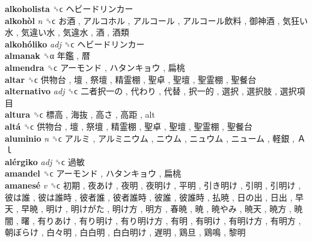 \textbf{alkoholista} ␝ϲ   ヘビードリンカー   \\
\textbf{alkohòl} \emph{n}  ␝ϲ   お酒 ,  アルコホル ,  アルコール ,  アルコール飲料 ,  御神酒 ,  気狂い水 ,  気違い水 ,  気違水 ,  酒 ,  酒類   \\
\textbf{alkohóliko} \emph{adj}  ␝ϲ   ヘビードリンカー   \\
\textbf{almanak} ␝α   年鑑 ,  暦   \\
\textbf{almendra} ␝ϲ   アーモンド ,  ハタンキョウ ,  扁桃   \\
\textbf{altar} ␝ϲ   供物台 ,  壇 ,  祭壇 ,  精霊棚 ,  聖卓 ,  聖壇 ,  聖霊棚 ,  聖餐台   \\
\textbf{alternativo} \emph{adj}  ␝ϲ   二者択一の ,  代わり ,  代替 ,  択一的 ,  選択 ,  選択肢 ,  選択項目   \\
\textbf{altura} ␝ϲ   標高 ,  海抜 ,  高さ ,  高距 , alt  \\
\textbf{altá} ␝ϲ   供物台 ,  壇 ,  祭壇 ,  精霊棚 ,  聖卓 ,  聖壇 ,  聖霊棚 ,  聖餐台   \\
\textbf{aluminio} \emph{n}  ␝ϲ   アルミ ,  アルミニウム ,  ニウム ,  ニュウム ,  ニューム ,  軽銀 ,  Ａｌ   \\
\textbf{alérgiko} \emph{adj}  ␝ϲ   過敏   \\
\textbf{amandel} ␝ϲ   アーモンド ,  ハタンキョウ ,  扁桃   \\
\textbf{amanesé} \emph{v}  ␝ϲ   初期 ,  夜あけ ,  夜明 ,  夜明け ,  平明 ,  引き明け ,  引明 ,  引明け ,  彼は誰 ,  彼は誰時 ,  彼者誰 ,  彼者誰時 ,  彼誰 ,  彼誰時 ,  払暁 ,  日の出 ,  日出 ,  早天 ,  早暁 ,  明け ,  明けがた ,  明け方 ,  明方 ,  春暁 ,  暁 ,  暁やみ ,  暁天 ,  暁方 ,  暁闇 ,  曙 ,  有りあけ ,  有り明け ,  有り明け方 ,  有明 ,  有明け ,  有明け方 ,  有明方 ,  朝ぼらけ ,  白々明 ,  白白明 ,  白白明け ,  遅明 ,  鶏旦 ,  鶏鳴 ,  黎明   \\
